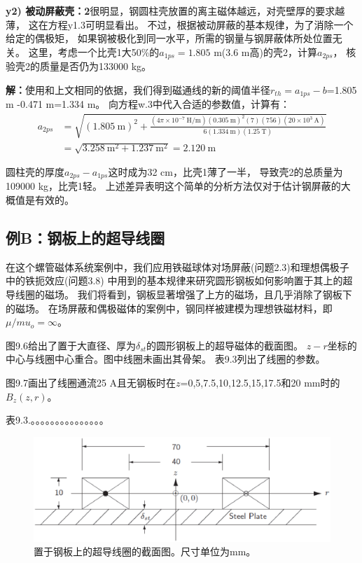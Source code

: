 \textbf{y2) 被动屏蔽壳：2}\qquad 很明显，钢圆柱壳放置的离主磁体越远，对壳壁厚的要求越薄，
这在方程y1.3可明显看出。
不过，根据被动屏蔽的基本规律，为了消除一个给定的偶极矩，
如果钢被极化到同一水平，所需的钢量与钢屏蔽体所处位置无关。
这里，考虑一个比壳1大50\%的$a_{1ps}=1.805$ m(3.6 m高)的壳2，计算$a_{2ps}$，
核验壳2的质量是否仍为133000 kg。

\textbf{解：}使用和上文相同的依据，我们得到磁通线的新的阈值半径$r_{th}=a_{1ps}-b$=1.805 m
-0.471 m=1.334 m。
向方程w.3中代入合适的参数值，计算有：
\begin{align*}%
a_{2ps}&=\sqrt{(1.805\ \mathrm{m})^2+\frac{(4\pi\times 10^{-7}\ \mathrm{H/m})(0.305\ \mathrm{m})^2(7)(756)(20\times 10^3\ \mathrm{A})}{6(1.334\ \mathrm{m})(1.25\ \mathrm{T})}}\\
&=\sqrt{3.258\ \mathrm{m^2}+1.237\ \mathrm{m^2}}=2.120\ \mathrm{m}
\end{align*}

圆柱壳的厚度$a_{2ps}-a_{1ps}$这时成为32 cm，比壳1薄了一半，
导致壳2的总质量为109000 kg，比壳1轻。
上述差异表明这个简单的分析方法仅对于估计钢屏蔽的大概值是有效的。


\subsection{例B：钢板上的超导线圈}
在这个螺管磁体系统案例中，我们应用铁磁球体对场屏蔽(问题2.3)和理想偶极子中的铁扼效应(问题3.8)
中用到的基本规律来研究圆形钢板如何影响置于其上的超导线圈的磁场。
我们将看到，钢板显著增强了上方的磁场，且几乎消除了钢板下的磁场。
在场屏蔽和偶极磁体的案例中，钢同样被建模为理想铁磁材料，即$\mu/mu_o=\infty$。

图9.6给出了置于大直径、厚为$\delta_{st}$的圆形钢板上的超导磁体的截面图。
$z-r$坐标的中心与线圈中心重合。图中线圈未画出其骨架。
表9.3列出了线圈的参数。

图9.7画出了线圈通流25 A且无钢板时在$z$=0,5,7.5,10,12.5,15,17.5和20 mm时的$B_z(z,r)$。

表9.3.。。。。。。。。。。。。。。。

\begin{figure}
	\centering
	\includegraphics[scale=0.5]{chpt9/figs/fig9.6.eps}
	\caption{置于钢板上的超导线圈的截面图。尺寸单位为mm。}
\end{figure}


